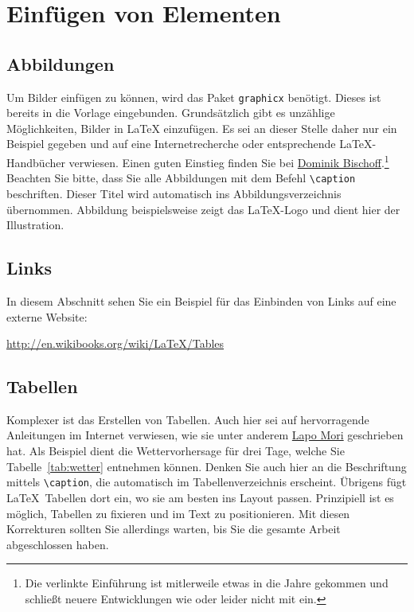 \documentclass{scrbook}
\begin{document}
\section{Einfügen von Elementen}
\label{sec:gleitumgebungen}

\subsection{Abbildungen}
Um Bilder einfügen zu können, wird das Paket \texttt{graphicx}  benötigt. Dieses ist bereits in die Vorlage eingebunden. Grundsätzlich gibt es unzählige Möglichkeiten,  Bilder in \LaTeX{} einzufügen. Es sei an dieser Stelle daher nur ein Beispiel gegeben und auf eine Internetrecherche oder entsprechende \LaTeX-Handbücher verwiesen. Einen guten Einstieg finden Sie bei \href{https://mirrors.ctan.org/info/l2picfaq/german/l2picfaq.pdf}{\color{blue} Dominik Bischoff}.\footnote{Die verlinkte Einführung ist mitlerweile etwas in die Jahre gekommen und schließt neuere Entwicklungen wie  oder  leider nicht mit ein.} 
Beachten Sie bitte, dass Sie alle Abbildungen mit dem Befehl \verb|\caption| beschriften. Dieser Titel wird automatisch ins Abbildungsverzeichnis übernommen. Abbildung  beispielsweise zeigt das \LaTeX-Logo und dient hier der Illustration.


\subsection{Links}
In diesem Abschnitt sehen Sie ein Beispiel für das Einbinden von Links auf eine externe Website:

\begin{center}
	\href{http://en.wikibooks.org/wiki/LaTeX/Tables}{\color{blue} http://en.wikibooks.org/wiki/LaTeX/Tables}
\end{center}
 
\subsection{Tabellen}
Komplexer ist das Erstellen von Tabellen. Auch hier sei auf hervorragende Anleitungen im Internet verwiesen, wie sie unter anderem \href{https://www.tug.org/pracjourn/2007-1/mori/mori.pdf}{\color{blue} Lapo Mori} geschrieben hat. Als Beispiel dient die Wettervorhersage für drei Tage, welche Sie Tabelle~\ref{tab:wetter} entnehmen können. Denken Sie auch hier an die Beschriftung mittels \verb|\caption|, die automatisch im Tabellenverzeichnis erscheint. Übrigens fügt \LaTeX\ Tabellen dort ein, wo sie am besten ins Layout passen. Prinzipiell ist es möglich, Tabellen zu fixieren und im Text zu positionieren. Mit diesen Korrekturen sollten Sie allerdings warten, bis Sie die gesamte Arbeit abgeschlossen haben.
\end{document}
